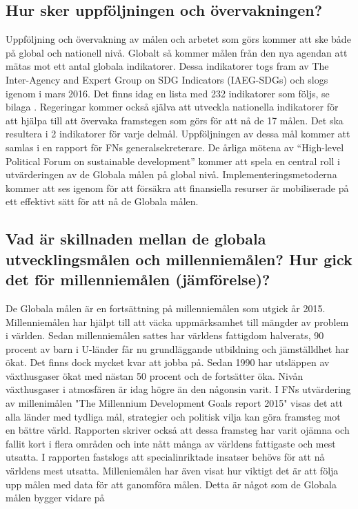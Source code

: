 \documentclass{report}
\begin{document}
\subsection{Hur sker uppföljningen och övervakningen?} 
Uppföljning och övervakning av målen och arbetet som görs kommer att ske både på global och nationell nivå. Globalt så kommer målen från den nya agendan att mätas mot ett antal globala indikatorer. Dessa indikatorer togs fram av The Inter-Agency and Expert Group on SDG Indicators (IAEG-SDGs) och slogs igenom i mars 2016. \cite{web2030agenda}
Det finns idag en lista med 232 indikatorer som följs, se bilaga \cite{webUN2}.
Regeringar kommer också själva att utveckla nationella indikatorer för att hjälpa till att övervaka framstegen som görs för att nå de 17 målen. Det ska resultera i 2 indikatorer för varje delmål. Uppföljningen av dessa mål kommer att samlas i en rapport för FNs generalsekreterare. De årliga mötena av  “High-level Political Forum on sustainable development” kommer att spela en central roll i utvärderingen av de Globala målen på global nivå. Implementeringsmetoderna kommer att ses igenom för att försäkra att finansiella resurser är mobiliserade på ett effektivt sätt för att nå de Globala målen.  \cite{web2030agenda}\\

\subsection{Vad är skillnaden mellan de globala utvecklingsmålen och millenniemålen? Hur gick det för millenniemålen (jämförelse)? } 
De Globala målen är en fortsättning på millenniemålen som utgick år 2015. Millenniemålen har hjälpt till att väcka uppmärksamhet till mängder av problem i världen. Sedan millenniemålen sattes har världens fattigdom halverats, 90 procent av barn i U-länder får nu grundläggande utbildning och jämställdhet har ökat. Det finns dock mycket kvar att jobba på. \cite{webEuropeanComission}
Sedan 1990 har utsläppen av växthusgaser ökat med nästan 50 procent och de fortsätter öka. Nivån växthusgaser i atmosfären är idag högre än den någonsin varit. \cite{UN1}
I FNs utvärdering av millenimålen "The Millennium Development Goals report 2015" \cite{Millennium} visas det att alla länder med tydliga mål, strategier och politisk vilja kan göra framsteg mot en bättre värld. Rapporten skriver också att dessa framsteg har varit ojämna och fallit kort i flera områden och inte nått många av världens fattigaste och mest utsatta. I rapporten fastslogs att specialinriktade insatser behövs för att nå världens mest utsatta.  Milleniemålen har även visat hur viktigt det är att följa upp målen med data för att ganomföra målen. Detta är något som de Globala målen bygger vidare på\cite{Millennium}
\end{document}
